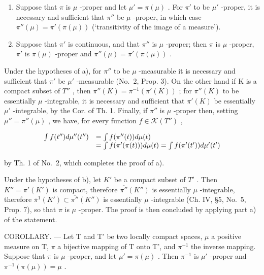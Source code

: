 \begin{enumerate}
\def\labelenumi{\alph{enumi})}
\item
  Suppose that \(\pi\) is \(\mu\) -proper and let \(\mu' = \pi(\mu)\) . For \(\pi'\) to be \(\mu'\) -proper, it is necessary and sufficient that \(\pi''\) be \(\mu\) -proper, in which case \(\pi''(\mu) = \pi'(\pi(\mu))\) (`transitivity of the image of a measure').
\item
  Suppose that \(\pi'\) is continuous, and that \(\pi''\) is \(\mu\) -proper; then \(\pi\) is \(\mu\) -proper, \(\pi'\) is \(\pi(\mu)\) -proper and \(\pi''(\mu) = \pi'(\pi(\mu))\) .
\end{enumerate}

Under the hypotheses of a), for \(\pi''\) to be \(\mu\) -measurable it is necessary and sufficient that \(\pi'\) be \(\mu'\) -measurable (No.~2, Prop. 3). On the other hand if K is a compact subset of \(T''\) , then \(\pi''(K) = \pi^{-1}(\pi'(K))\) ; for \(\pi''(K)\) to be essentially \(\mu\) -integrable, it is necessary and sufficient that \(\pi'(K)\) be essentially \(\mu'\) -integrable, by the Cor. of Th. 1. Finally, if \(\pi''\) is \(\mu\) -proper then, setting \(\mu'' = \pi''(\mu)\) , we have, for every function \(f \in \mathcal{K}(T'')\) ,

\[
\begin{array}{r l} \int f (t ^ {\prime \prime}) d \mu^ {\prime \prime} (t ^ {\prime \prime}) & = \int f (\pi^ {\prime \prime} (t)) d \mu (t) \\ & = \int f (\pi^ {\prime} (\pi (t))) d \mu (t) = \int f (\pi^ {\prime} (t ^ {\prime})) d \mu^ {\prime} (t ^ {\prime}) \end{array}
\]

by Th. 1 of No.~2, which completes the proof of a).

Under the hypotheses of b), let \(K'\) be a compact subset of \(T'\) . Then \(K'' = \pi'(K')\) is compact, therefore \(\overline{\pi''}(K'')\) is essentially \(\mu\) -integrable, therefore \(\overline{\pi}^{1}(K') \subset \overline{\pi''}(K'')\) is essentially \(\mu\) -integrable (Ch. IV, §5, No.~5, Prop. 7), so that \(\pi\) is \(\mu\) -proper. The proof is then concluded by applying part a) of the statement.

COROLLARY. --- Let T and T' be two locally compact spaces, \(\mu\) a positive measure on T, \(\pi\) a bijective mapping of T onto T', and \(\pi^{-1}\) the inverse mapping. Suppose that \(\pi\) is \(\mu\) -proper, and let \(\mu' = \pi(\mu)\) . Then \(\pi^{-1}\) is \(\mu'\) -proper and \(\pi^{-1}(\pi(\mu)) = \mu\) .

